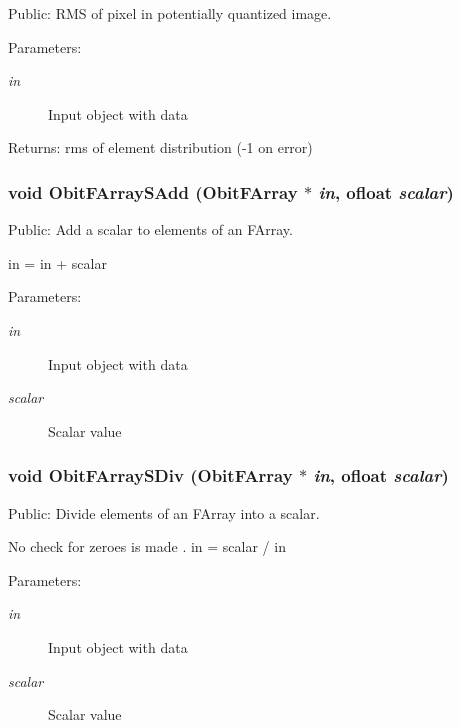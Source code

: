 Public: RMS of pixel in potentially quantized image. 

\begin{Desc}
\item[Parameters:]
\begin{description}
\item[{\em in}]Input object with data \end{description}
\end{Desc}
\begin{Desc}
\item[Returns:]rms of element distribution (-1 on error) \end{Desc}
\subsubsection{\setlength{\rightskip}{0pt plus 5cm}void Obit\-FArray\-SAdd ({\bf Obit\-FArray} $\ast$ {\em in}, {\bf ofloat} {\em scalar})}\label{ObitFArray_8c_a42}


Public: Add a scalar to elements of an FArray. 

in = in + scalar \begin{Desc}
\item[Parameters:]
\begin{description}
\item[{\em in}]Input object with data \item[{\em scalar}]Scalar value \end{description}
\end{Desc}
\subsubsection{\setlength{\rightskip}{0pt plus 5cm}void Obit\-FArray\-SDiv ({\bf Obit\-FArray} $\ast$ {\em in}, {\bf ofloat} {\em scalar})}\label{ObitFArray_8c_a44}


Public: Divide elements of an FArray into a scalar. 

No check for zeroes is made . in = scalar / in \begin{Desc}
\item[Parameters:]
\begin{description}
\item[{\em in}]Input object with data \item[{\em scalar}]Scalar value \end{description}
\end{Desc}
